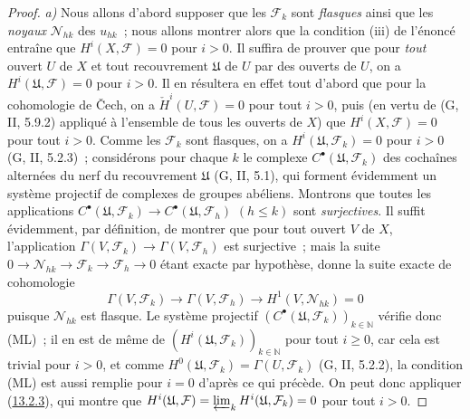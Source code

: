 \begin{proof}
\emph{a)} Nous allons d'abord supposer que les $\mathcal F_k$ sont \emph{flasques}
ainsi que les \emph{noyaux} $\mathcal N_{hk}$ des $u_{hk}$~; nous allons montrer
alors que la condition (iii) de l'énoncé entraîne que
$H^i(X,\mathcal F)=0$ pour $i>0$. Il suffira de prouver que pour \emph{tout} ouvert
$U$ de $X$ et tout recouvrement $\mathfrak U$ de $U$ par des ouverts de
$U$, on a $H^i(\mathfrak U,\mathcal F)=0$ pour $i>0$. Il en résultera
en effet tout d'abord que pour la cohomologie de Čech, on a
$\check H^i(U,\mathcal F)=0$ pour tout $i>0$, puis (en vertu de
(G, II, 5.9.2) appliqué à l'ensemble de tous les ouverts de $X$) que
$H^i(X,\mathcal F)=0$ pour tout $i>0$. Comme les $\mathcal F_k$ sont
flasques, on a $H^i(\mathfrak U,\mathcal F_k)=0$ pour $i>0$
(G, II, 5.2.3)~; considérons pour chaque $k$ le complexe
$C^\bullet(\mathfrak U,\mathcal F_k)$ des cochaînes alternées du nerf
du recouvrement $\mathfrak U$ (G, II, 5.1), qui forment évidemment un
système projectif de complexes de groupes abéliens. Montrons que toutes les
applications
$C^\bullet(\mathfrak U,\mathcal F_k)\to
C^\bullet(\mathfrak U,\mathcal F_h)$ $(h\leq k)$ sont \emph{surjectives}.
Il suffit évidemment, par définition, de montrer que pour tout ouvert $V$
de $X$, l'application
$\Gamma(V,\mathcal F_k)\to\Gamma(V,\mathcal F_h)$ est surjective~; mais la
suite
$0\to\mathcal N_{hk}\to\mathcal F_k\to\mathcal F_h\to0$
étant exacte par hypothèse, donne la suite exacte de cohomologie
\[
\Gamma(V,\mathcal F_k)\longrightarrow\Gamma(V,\mathcal F_h)
\longrightarrow H^1(V,\mathcal N_{hk})=0
\]
puisque $\mathcal N_{hk}$ est flasque. Le système projectif
$(C^\bullet(\mathfrak U,\mathcal F_k))_{k\in\mathbb N}$ vérifie donc
(ML)~; il en est de même de
$(H^i(\mathfrak U,\mathcal F_k))_{k\in\mathbb N}$ pour tout
$i\geq0$, car cela est trivial pour $i>0$, et comme
$H^0(\mathfrak U,\mathcal F_k)=\Gamma(U,\mathcal F_k)$
(G, II, 5.2.2), la condition (ML) est aussi remplie pour $i=0$ d'après ce
qui précède. On peut donc appliquer
(\hyperref[0.13.2.3-fr]{13.2.3}), qui montre que
$H^i(\mathfrak U,\mathcal F)=\varprojlim_k H^i(\mathfrak U,\mathcal F_k)=0$ pour tout $i>0$.


\end{proof}
